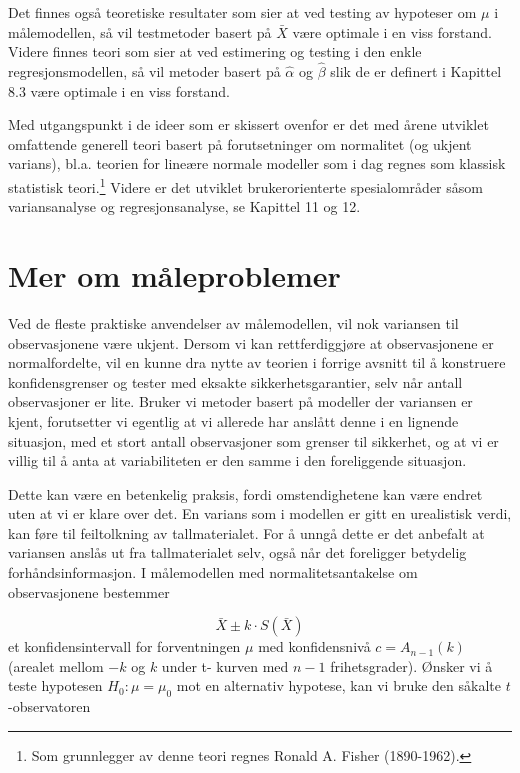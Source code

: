 Det finnes også teoretiske resultater som sier at ved testing
av hypoteser om $\mu$ i målemodellen, så vil testmetoder
basert på $\bar X$ være optimale i en viss forstand.
Videre finnes teori som sier at ved estimering og testing i den
enkle regresjonsmodellen, så vil metoder basert på
$\hat\alpha$ og $\hat\beta$ slik de er definert i Kapittel 8.3
være optimale i en viss forstand.
                                                              
Med utgangspunkt i de ideer som er skissert ovenfor er det med
årene utviklet omfattende generell teori basert på forutsetninger
om normalitet (og ukjent varians), bl.a. teorien for lineære
normale modeller som i dag regnes som klassisk statistisk
teori.\footnote{Som grunnlegger av denne teori regnes Ronald A.
Fisher (1890-1962).} Videre er det utviklet brukerorienterte
spesialområder såsom variansanalyse og regresjonsanalyse,
se Kapittel 11 og 12. 

\section{ Mer om måleproblemer}

Ved de fleste praktiske anvendelser av målemodellen, vil nok
variansen til observasjonene være ukjent. Dersom vi kan
rettferdiggjøre at observasjonene er normalfordelte, vil en
kunne dra nytte av teorien i forrige avsnitt til å konstruere
konfidensgrenser og tester med eksakte sikkerhetsgarantier, selv
når antall observasjoner er lite. Bruker vi metoder basert
på modeller der variansen er kjent, forutsetter vi egentlig
at vi allerede har anslått denne i en lignende situasjon, med
et stort antall observasjoner som grenser til sikkerhet, og at vi
er villig til å anta at variabiliteten er den samme i den
foreliggende situasjon.

Dette kan være en betenkelig
praksis, fordi omstendighetene kan være endret uten at vi er
klare over det. En varians som i modellen er gitt en urealistisk verdi,
kan føre til feiltolkning av tallmaterialet. For å
unngå dette er det anbefalt at variansen anslås ut fra
tallmaterialet selv, også når det foreligger betydelig
forhåndsinformasjon.
I målemodellen med normalitetsantakelse om observasjonene
bestemmer

\[  \bar X \pm k\cdot S(\bar X)\]
et konfidensintervall for forventningen $\mu$ med
konfidensnivå $c=A_{n-1}(k)$ (arealet mellom $-k$ og $k$ under t-
kurven med $n-1$ frihetsgrader). Ønsker vi å teste
hypotesen $H_0:\mu={\mu}_0$ mot en alternativ hypotese, kan vi
bruke den såkalte $t$-observatoren

